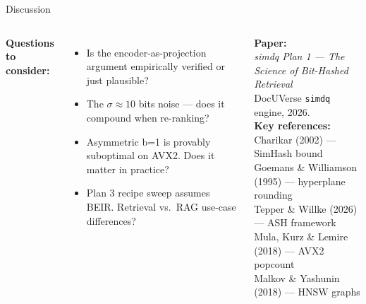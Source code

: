 \documentclass[aspectratio=169,12pt]{beamer}
\begin{document}
\begin{frame}{Discussion}

\begin{columns}
\textbf{Questions to consider:}
\begin{itemize}
  \item Is the encoder-as-projection argument empirically verified or just plausible?
  \item The $\sigma \approx 10$ bits noise — does it compound when re-ranking?
  \item Asymmetric b=1 is provably suboptimal on AVX2. Does it matter in practice?
  \item Plan 3 recipe sweep assumes BEIR. Retrieval vs.\ RAG use-case differences?
\end{itemize}

\textbf{Paper:}\\
\textit{simdq Plan 1 — The Science of Bit-Hashed Retrieval}\\
DocUVerse \texttt{simdq} engine, 2026.\\[8pt]
\textbf{Key references:}\\
{\small
Charikar (2002) — SimHash bound\\
Goemans \& Williamson (1995) — hyperplane rounding\\
Tepper \& Willke (2026) — ASH framework\\
Mula, Kurz \& Lemire (2018) — AVX2 popcount\\
Malkov \& Yashunin (2018) — HNSW graphs
}
\end{columns}

\end{frame}
\end{document}
